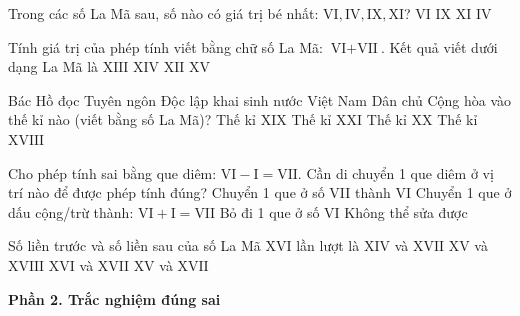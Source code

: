 \begin{ex} %
Trong các số La Mã sau, số nào có giá trị bé nhất: $\text{VI}, \text{IV}, \text{IX}, \text{XI}$?
\choice
{$\text{VI}$}
{$\text{IX}$}
{$\text{XI}$}
{\True $\text{IV}$}
\end{ex}

\begin{ex} %
Tính giá trị của phép tính viết bằng chữ số La Mã: $\text{VI} + \text{VII}$. Kết quả viết dưới dạng La Mã là
\choice
{\True $\text{XIII}$}
{$\text{XIV}$}
{$\text{XII}$}
{$\text{XV}$}
\end{ex}

\begin{ex} %
Bác Hồ đọc Tuyên ngôn Độc lập khai sinh nước Việt Nam Dân chủ Cộng hòa vào thế kỉ nào (viết bằng số La Mã)?
\choice
{Thế kỉ $\text{XIX}$}
{Thế kỉ $\text{XXI}$}
{\True Thế kỉ $\text{XX}$}
{Thế kỉ $\text{XVIII}$}
\end{ex}

\begin{ex} %
Cho phép tính sai bằng que diêm: $\text{VI} - \text{I} = \text{VII}$. Cần di chuyển 1 que diêm ở vị trí nào để được phép tính đúng?
\choice
{Chuyển 1 que ở số VII thành VI}
{\True Chuyển 1 que ở dấu cộng/trừ thành: $\text{VI} + \text{I} = \text{VII}$}
{Bỏ đi 1 que ở số VI}
{Không thể sửa được}
\end{ex}

\begin{ex} %
Số liền trước và số liền sau của số La Mã $\text{XVI}$ lần lượt là
\choice
{$\text{XIV}$ và $\text{XVII}$}
{$\text{XV}$ và $\text{XVIII}$}
{$\text{XVI}$ và $\text{XVII}$}
{\True $\text{XV}$ và $\text{XVII}$}
\end{ex}

\textbf{Phần 2. Trắc nghiệm đúng sai}

